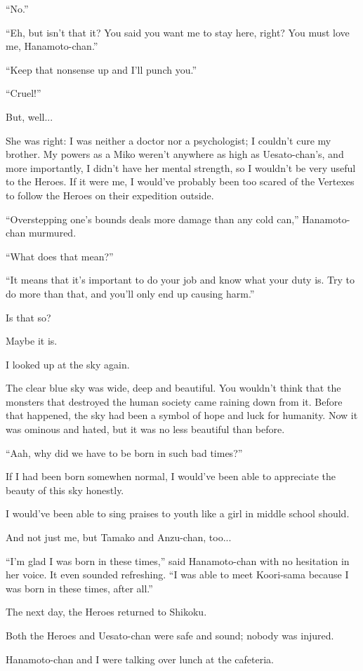 ``No.''

``Eh, but isn't that it? You said you want me to stay here, right? You must love me, Hanamoto-chan.''

``Keep that nonsense up and I'll punch you.''

``Cruel!''

But, well...

She was right: I was neither a doctor nor a psychologist; I couldn't cure my brother. My powers as a Miko weren't anywhere as high as Uesato-chan's, and more importantly, I didn't have her mental strength, so I wouldn't be very useful to the Heroes. If it were me, I would've probably been too scared of the Vertexes to follow the Heroes on their expedition outside.

``Overstepping one's bounds deals more damage than any cold can,'' Hanamoto-chan murmured.

``What does that mean?''

``It means that it's important to do your job and know what your duty is. Try to do more than that, and you'll only end up causing harm.''

Is that so?

Maybe it is.

I looked up at the sky again.

The clear blue sky was wide, deep and beautiful. You wouldn't think that the monsters that destroyed the human society came raining down from it. Before that happened, the sky had been a symbol of hope and luck for humanity. Now it was ominous and hated, but it was no less beautiful than before.

``Aah, why did we have to be born in such bad times?''

If I had been born somewhen normal, I would've been able to appreciate the beauty of this sky honestly.

I would've been able to sing praises to youth like a girl in middle school should.

And not just me, but Tamako and Anzu-chan, too...

``I'm glad I was born in these times,'' said Hanamoto-chan with no hesitation in her voice. It even sounded refreshing.  ``I was able to meet Koori-sama because I was born in these times, after all.''

The next day, the Heroes returned to Shikoku.

Both the Heroes and Uesato-chan were safe and sound; nobody was injured.

Hanamoto-chan and I were talking over lunch at the cafeteria.

